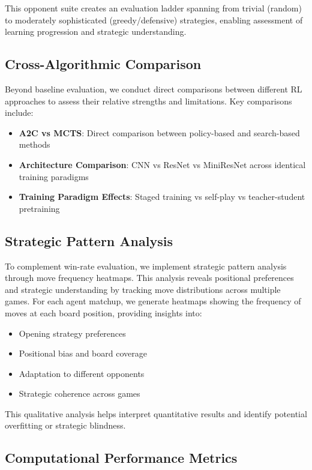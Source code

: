 \documentclass[conference]{IEEEtran}
\begin{document}
This opponent suite creates an evaluation ladder spanning from trivial (random) to moderately sophisticated (greedy/defensive) strategies, enabling assessment of learning progression and strategic understanding.

\subsection{Cross-Algorithmic Comparison}

Beyond baseline evaluation, we conduct direct comparisons between different RL approaches to assess their relative strengths and limitations. Key comparisons include:

\begin{itemize}
\item \textbf{A2C vs MCTS}: Direct comparison between policy-based and search-based methods
\item \textbf{Architecture Comparison}: CNN vs ResNet vs MiniResNet across identical training paradigms
\item \textbf{Training Paradigm Effects}: Staged training vs self-play vs teacher-student pretraining
\end{itemize}

\subsection{Strategic Pattern Analysis}

To complement win-rate evaluation, we implement strategic pattern analysis through move frequency heatmaps. This analysis reveals positional preferences and strategic understanding by tracking move distributions across multiple games. For each agent matchup, we generate heatmaps showing the frequency of moves at each board position, providing insights into:

\begin{itemize}
\item Opening strategy preferences
\item Positional bias and board coverage
\item Adaptation to different opponents
\item Strategic coherence across games
\end{itemize}

This qualitative analysis helps interpret quantitative results and identify potential overfitting or strategic blindness.

\subsection{Computational Performance Metrics}
\end{document}
